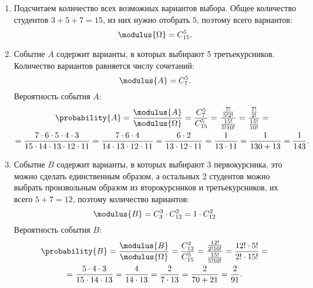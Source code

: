 \begin{enumerate}
    \item
    Подсчитаем количество всех возможных вариантов выбора. Общее количество студентов $3+5+7=15$, из них нужно отобрать $5$, поэтому всего вариантов:
    \begin{equation}
        \modulus{\Omega} = C_{15}^5 .
    \end{equation}

    \item
    Событие $A$ содержит варианты, в которых выбирают 5 третьекурсников. Количество вариантов равняется числу сочетаний:
    \begin{equation}
        \modulus{A} = C_7^5 .
    \end{equation}
    Вероятность события $A$:
    \begin{multline}
        \probability{A}
        = \frac{\modulus{A}}{\modulus{\Omega}}
        = \frac{C_7^5}{C_{15}^5}
        = \frac{\frac{7!}{5!2!}}{\frac{15!}{5!10!}}
        = \frac{\frac{7!}{2!}}{\frac{15!}{10!}} = \\
        = \frac{7 \cdot 6 \cdot 5 \cdot 4 \cdot 3}{15 \cdot 14 \cdot 13 \cdot 12 \cdot 11}
        = \frac{7 \cdot 6 \cdot 4}{14 \cdot 13 \cdot 12 \cdot 11}
        = \frac{6 \cdot 2}{13 \cdot 12 \cdot 11}
        = \frac{1}{13 \cdot 11}
        = \frac{1}{130 + 13}
        = \frac{1}{143} .
    \end{multline}

    \item
    Событие $B$ содержит варианты, в которых выбирают 3 первокурсника, это можно сделать единственным образом, а остальных 2 студентов можно выбрать произвольным образом
    из второкурсников и третьекурсников, их всего $5+7 = 12$, поэтому количество вариантов:
    \begin{equation}
        \modulus{B}
        = C_3^3 \cdot C_{12}^2
        = 1 \cdot C_{12}^2
    \end{equation}
    Вероятность события $B$:
    \begin{multline}
        \probability{B}
        = \frac{\modulus{B}}{\modulus{\Omega}}
        = \frac{C_{12}^2}{C_{15}^5}
        = \frac{\frac{12!}{2!10!}}{\frac{15!}{5!10!}}
        = \frac{12! \cdot 5!}{2! \cdot 15!} = \\
        = \frac{5 \cdot 4 \cdot 3}{15 \cdot 14 \cdot 13}
        = \frac{4}{14 \cdot 13}
        = \frac{2}{7 \cdot 13}
        = \frac{2}{70 + 21}
        = \frac{2}{91} .
    \end{multline}


\end{enumerate}
